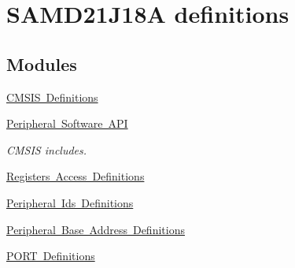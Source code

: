 \hypertarget{group___s_a_m_d21_j18_a__definitions}{}\section{S\+A\+M\+D21\+J18A definitions}
\label{group___s_a_m_d21_j18_a__definitions}
\subsection*{Modules}
\begin{DoxyCompactItemize}
\item 
\mbox{\hyperlink{group___s_a_m_d21_j18_a__cmsis}{C\+M\+S\+I\+S Definitions}}
\item 
\mbox{\hyperlink{group___s_a_m_d21_j18_a__api}{Peripheral Software A\+PI}}
\begin{DoxyCompactList}\small\item\em C\+M\+S\+IS includes. \end{DoxyCompactList}\item 
\mbox{\hyperlink{group___s_a_m_d21_j18_a__reg}{Registers Access Definitions}}
\item 
\mbox{\hyperlink{group___s_a_m_d21_j18_a__id}{Peripheral Ids Definitions}}
\item 
\mbox{\hyperlink{group___s_a_m_d21_j18_a__base}{Peripheral Base Address Definitions}}
\item 
\mbox{\hyperlink{group___s_a_m_d21_j18_a__port}{P\+O\+R\+T Definitions}}
\end{DoxyCompactItemize}
